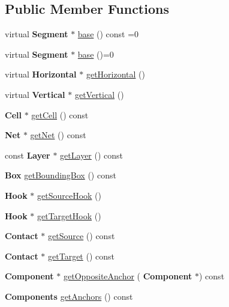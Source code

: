 \subsection*{Public Member Functions}
\begin{DoxyCompactItemize}
\item 
virtual \textbf{ Segment} $\ast$ \hyperlink{classKatabatic_1_1AutoSegment_a53877ff5ef48eb0030c2581a6eeb3c09}{base} () const =0
\item 
virtual \textbf{ Segment} $\ast$ \hyperlink{classKatabatic_1_1AutoSegment_ade416d0483aefe986988fa89a7cf6fcf}{base} ()=0
\item 
virtual \textbf{ Horizontal} $\ast$ \hyperlink{classKatabatic_1_1AutoSegment_a659b8ed90de679564924afe07af478de}{get\+Horizontal} ()
\item 
virtual \textbf{ Vertical} $\ast$ \hyperlink{classKatabatic_1_1AutoSegment_ab6a809b6f3ef3cf5385fa35580e31e7a}{get\+Vertical} ()
\item 
\textbf{ Cell} $\ast$ \hyperlink{classKatabatic_1_1AutoSegment_a55a3a88610ef1af9931e634f77f2403b}{get\+Cell} () const
\item 
\textbf{ Net} $\ast$ \hyperlink{classKatabatic_1_1AutoSegment_a692492374623a5c6096b2c4a51190359}{get\+Net} () const
\item 
const \textbf{ Layer} $\ast$ \hyperlink{classKatabatic_1_1AutoSegment_ab045567c4f529dca7790d66c17c3084f}{get\+Layer} () const
\item 
\textbf{ Box} \hyperlink{classKatabatic_1_1AutoSegment_a63a3ab1e6501bbad68b9efd4998e48c0}{get\+Bounding\+Box} () const
\item 
\textbf{ Hook} $\ast$ \hyperlink{classKatabatic_1_1AutoSegment_a1defbbaef0a1975993e157a8d5f68ded}{get\+Source\+Hook} ()
\item 
\textbf{ Hook} $\ast$ \hyperlink{classKatabatic_1_1AutoSegment_ad62048f68151e5db987b5a7c79cce4ed}{get\+Target\+Hook} ()
\item 
\textbf{ Contact} $\ast$ \hyperlink{classKatabatic_1_1AutoSegment_a497ea2ceeddb939dbc84eae0e7862335}{get\+Source} () const
\item 
\textbf{ Contact} $\ast$ \hyperlink{classKatabatic_1_1AutoSegment_a0862c201bd7d8e5427e44ca2427c2fe6}{get\+Target} () const
\item 
\textbf{ Component} $\ast$ \hyperlink{classKatabatic_1_1AutoSegment_a9216d4467c2d4e0c7b9d9a8b8e798bee}{get\+Opposite\+Anchor} (\textbf{ Component} $\ast$) const
\item 
\textbf{ Components} \hyperlink{classKatabatic_1_1AutoSegment_a7339a1ebc7d46384bc4e1317af84bea1}{get\+Anchors} () const

\end{DoxyCompactItemize}
